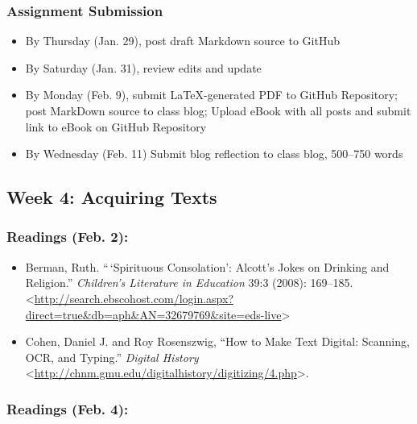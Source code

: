 \documentclass[]{article}
\begin{document}
\subsubsection{Assignment Submission}\label{assignment-submission}

\begin{itemize}
\itemsep1pt\parskip0pt
\item
  By Thursday (Jan. 29), post draft Markdown source to GitHub
\item
  By Saturday (Jan. 31), review edits and update
\item
  By Monday (Feb. 9), submit LaTeX-generated PDF to GitHub Repository;
  post MarkDown source to class blog; Upload eBook with all posts and
  submit link to eBook on GitHub Repository
\item
  By Wednesday (Feb. 11) Submit blog reflection to class blog, 500--750
  words
\end{itemize}

\subsection{Week 4: Acquiring Texts}\label{week-4-acquiring-texts}

\subsubsection{Readings (Feb. 2):}\label{readings-feb.-2}

\begin{itemize}
\itemsep1pt\parskip0pt
\item
  Berman, Ruth. ``\,`Spirituous Consolation': Alcott's Jokes on Drinking
  and Religion.'' \emph{Children's Literature in Education} 39:3 (2008):
  169--185.
  \textless{}\url{http://search.ebscohost.com/login.aspx?direct=true\&db=aph\&AN=32679769\&site=eds-live}\textgreater{}
\item
  Cohen, Daniel J. and Roy Rosenszwig, ``How to Make Text Digital:
  Scanning, OCR, and Typing.'' \emph{Digital History}
  \textless{}\url{http://chnm.gmu.edu/digitalhistory/digitizing/4.php}\textgreater{}.
\end{itemize}

\subsubsection{Readings (Feb. 4):}\label{readings-feb.-4}
\end{document}
